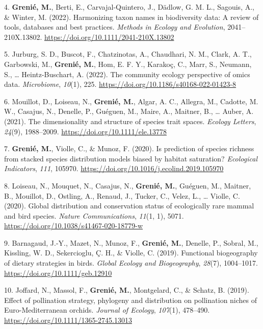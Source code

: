 \documentclass[10pt,a4paper,]{article}
\begin{document}
\leavevmode{}%
4. \textbf{Grenié, M.}, Berti, E., Carvajal-Quintero, J., Dädlow, G. M.
L., Sagouis, A., \& Winter, M. (2022). Harmonizing taxon names in
biodiversity data: A review of tools, databases and best practices.
\emph{Methods in Ecology and Evolution}, 2041--210X.13802.
\url{https://doi.org/10.1111/2041-210X.13802}

\leavevmode{}%
5. Jurburg, S. D., Buscot, F., Chatzinotas, A., Chaudhari, N. M., Clark,
A. T., Garbowski, M., \textbf{Grenié, M.}, Hom, E. F. Y., Karakoç, C.,
Marr, S., Neumann, S., \ldots{} Heintz-Buschart, A. (2022). The
community ecology perspective of omics data. \emph{Microbiome},
\emph{10}(1), 225. \url{https://doi.org/10.1186/s40168-022-01423-8}

\leavevmode{}%
6. Mouillot, D., Loiseau, N., \textbf{Grenié, M.}, Algar, A. C.,
Allegra, M., Cadotte, M. W., Casajus, N., Denelle, P., Guéguen, M.,
Maire, A., Maitner, B., \ldots{} Auber, A. (2021). The dimensionality
and structure of species trait spaces. \emph{Ecology Letters},
\emph{24}(9), 1988--2009. \url{https://doi.org/10.1111/ele.13778}

\leavevmode{}%
7. \textbf{Grenié, M.}, Violle, C., \& Munoz, F. (2020). Is prediction
of species richness from stacked species distribution models biased by
habitat saturation? \emph{Ecological Indicators}, \emph{111}, 105970.
\url{https://doi.org/10.1016/j.ecolind.2019.105970}

\leavevmode{}%
8. Loiseau, N., Mouquet, N., Casajus, N., \textbf{Grenié, M.}, Guéguen,
M., Maitner, B., Mouillot, D., Ostling, A., Renaud, J., Tucker, C.,
Velez, L., \ldots{} Violle, C. (2020). Global distribution and
conservation status of ecologically rare mammal and bird species.
\emph{Nature Communications}, \emph{11}(1, 1), 5071.
\url{https://doi.org/10.1038/s41467-020-18779-w}

\leavevmode{}%
9. Barnagaud, J.-Y., Mazet, N., Munoz, F., \textbf{Grenié, M.}, Denelle,
P., Sobral, M., Kissling, W. D., Sekercioglu, Ç. H., \& Violle, C.
(2019). Functional biogeography of dietary strategies in birds.
\emph{Global Ecology and Biogeography}, \emph{28}(7), 1004--1017.
\url{https://doi.org/10.1111/geb.12910}

\leavevmode{}%
10. Joffard, N., Massol, F., \textbf{Grenié, M.}, Montgelard, C., \&
Schatz, B. (2019). Effect of pollination strategy, phylogeny and
distribution on pollination niches of Euro-Mediterranean orchids.
\emph{Journal of Ecology}, \emph{107}(1), 478--490.
\url{https://doi.org/10.1111/1365-2745.13013}
\end{document}

